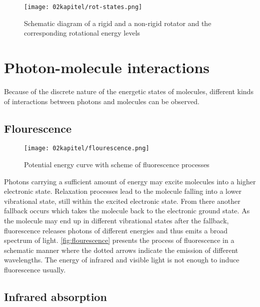 \begin{figure}[!htb]
    \centering
    \texttt{[image: 02kapitel/rot-states.png]}
    \caption[Scheme of rotational energy states: Rigid vs. Non-rigid rotator]{Schematic diagram of a rigid and a non-rigid rotator and the corresponding rotational energy levels \autocite{brauerApplicationRamanSpectroscopy2022}}
    \label{fig:rot-states}
\end{figure}

\section{Photon-molecule interactions}

Because of the discrete nature of the energetic states of molecules, different kinds of interactions between photons and molecules can be observed.

\subsection{Flourescence}

\begin{wrapfigure}{R}{.5\textwidth}
    \centering
    \texttt{[image: 02kapitel/flourescence.png]}
    \caption[Energy scheme of flourescence]{Potential energy curve with scheme of fluorescence processes \autocite{brauerApplicationRamanSpectroscopy2022}}
    \label{fig:flourescence}
\end{wrapfigure}
Photons carrying a sufficient amount of energy may excite molecules into a higher electronic state. Relaxation processes lead to the molecule falling into a lower vibrational state, still within the excited electronic state. From there another fallback occurs which takes the molecule back to the electronic ground state. As the molecule may end up in different vibrational states after the fallback, fluorescence releases photons of different energies and thus emits a broad spectrum of light. \autoref{fig:flourescence} presents the process of fluorescence in a schematic manner where the dotted arrows indicate the emission of different wavelengths. The energy of infrared and visible light is not enough to induce fluorescence usually.

\subsection{Infrared absorption}

